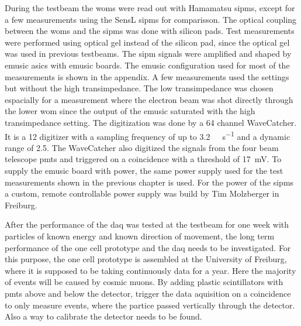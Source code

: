 During the testbeam the \acp{wom} were read out with Hamamatsu \acp{sipm}, except for a few measurements using the SensL \acp{sipm} for comparisson.
The optical coupling between the \acp{wom} and the \acp{sipm} was done with silicon pads.
Test measurements were performed using optical gel instead of the silicon pad, since the optical gel was used in previous testbeams.
The \ac{sipm} signals were amplified and shaped by \ac{emusic} \acp{asic} with \ac{emusic} boards.
The \ac{emusic} configuration used for most of the measurements is shown in the appendix.
A few measurements used the settings but without the high transimpedance.
The low transimpedance was chosen espacially for a measurement where the electron beam was shot directly through the lower \ac{wom} since the output of the \ac{emusic} saturated with the high transimpedance setting.
The digitization was done by a 64 channel WaveCatcher.
It is a \SI{12}{\bit} digitizer with a sampling frequency of up to \SI{3.2}{\giga\sample\per\second} and a dynamic range of \SI{2.5}{\voltpp}.
The WaveCatcher also digitized the signals from the four beam telescope \acp{pmt} and triggered on a coincidence with a threshold of \SI{17}{\milli\volt}.
To supply the \ac{emusic} board with power, the same power supply used for the test measurements shown in the previous chapter is used.
For the power of the \acp{sipm} a custom, remote controllable power supply was build by Tim Molzberger in Freiburg.






After the performance of the \ac{daq} was tested at the testbeam for one week with particles of known energy and known direction of movement, the long term performance of the one cell prototype and the \ac{daq} needs to be investigated.
For this purpose, the one cell prototype is assembled at the University of Freiburg, where it is supposed to be taking continuously data for a year.
Here the majority of events will be caused by cosmic muons.
By adding plastic scintillators with \acp{pmt} above and below the detector, trigger the data aquisition on a coincidence to only measure events, where the partice passed vertically through the detector.
Also a way to calibrate the detector needs to be found.
